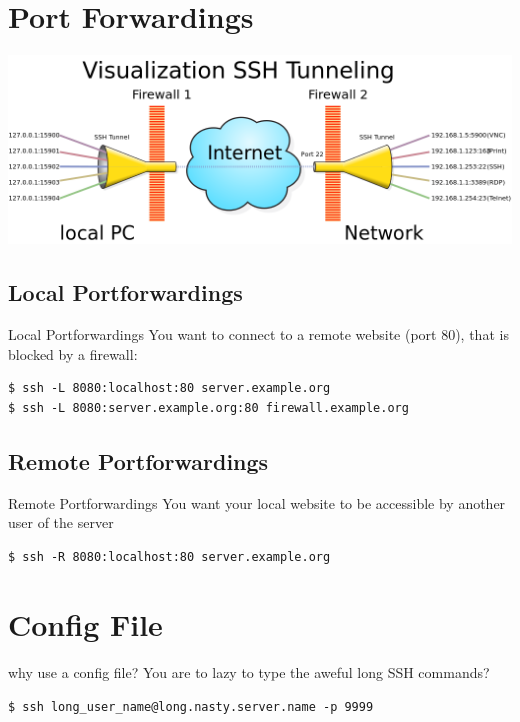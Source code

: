 \documentclass[10pt,graphics,aspectratio=169,table]{beamer}
\begin{document}
\section{Port Forwardings}
\begin{frame}
\includegraphics[width=\textwidth]{img/tunnel.png} \cite{tunnel}
\end{frame}

\subsection{Local Portforwardings}
\begin{frame}[fragile]{Local Portforwardings}
You want to connect to a remote website (port 80), that is blocked by a firewall:
\begin{lstlisting}
$ ssh -L 8080:localhost:80 server.example.org
$ ssh -L 8080:server.example.org:80 firewall.example.org
\end{lstlisting}
\end{frame}

\subsection{Remote Portforwardings}
\begin{frame}[fragile]{Remote Portforwardings}
You want your local website to be accessible by another user of the server
\begin{lstlisting}
$ ssh -R 8080:localhost:80 server.example.org
\end{lstlisting}
\end{frame}

\section{Config File}
\begin{frame}[fragile]{why use a config file?}
You are to lazy to type the aweful long SSH commands?
\begin{lstlisting}
$ ssh long_user_name@long.nasty.server.name -p 9999
\end{lstlisting}
\end{frame}
\end{document}

